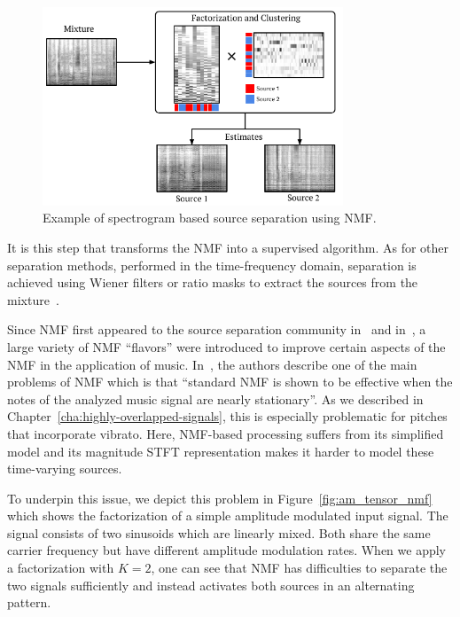 \begin{figure}[h]
  \centering
  \includegraphics[width=0.8\textwidth]{Chapters/06_Separation_Unknown/figures/nmf_separation.pdf}
  \caption{Example of spectrogram based source separation using \ac{NMF}.}
  \label{fig:nmf_separation}
\end{figure}

It is this step that transforms the \acs{NMF} into a supervised algorithm.
As for other separation methods, performed in the time-frequency domain, separation is achieved using Wiener filters or ratio masks to extract the sources from the mixture~\cite{liutkus15c}.
\par
Since \acs{NMF} first appeared to the source separation community in~\cite{smaragdis03} and in~\cite{vembu05}, a large variety of NMF ``flavors'' were introduced to improve certain aspects of the \acs{NMF} in the application of music. 
In~\cite[Chapter 16]{vincent18}, the authors describe one of the main problems of \acs{NMF} which is that ``standard \acs{NMF} is shown to be effective when the notes of the analyzed music signal are nearly stationary''.
As we described in Chapter~\ref{cha:highly-overlapped-signals}, this is especially problematic for pitches that incorporate vibrato.
Here, \acs{NMF}-based processing suffers from its simplified model and its magnitude \acs{STFT} representation makes it harder to model these time-varying sources.
\par
To underpin this issue, we depict this problem in Figure~\ref{fig:am_tensor_nmf} which shows the factorization of a simple amplitude modulated input signal. 
The signal consists of two sinusoids which are linearly mixed. 
Both share the same carrier frequency but have different amplitude modulation rates. 
When we apply a factorization with $K=2$, one can see that \acs{NMF} has difficulties to separate the two signals sufficiently and instead activates both sources in an alternating pattern.

